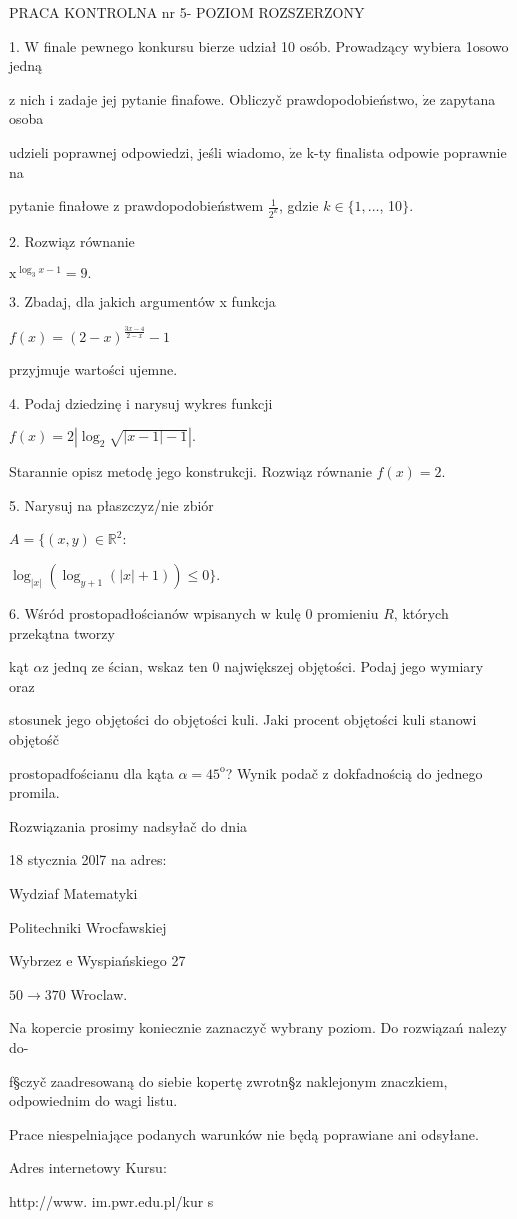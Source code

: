 \documentclass[a4paper,12pt]{article}
\begin{document}
PRACA KONTROLNA nr 5- POZIOM ROZSZERZONY

1. $\mathrm{W}$ finale pewnego konkursu bierze udział 10 osób. Prowadzący wybiera 1osowo jedną

$\mathrm{z}$ nich $\mathrm{i}$ zadaje jej pytanie finafowe. Obliczyč prawdopodobieństwo, $\dot{\mathrm{z}}\mathrm{e}$ zapytana osoba

udzieli poprawnej odpowiedzi, jeśli wiadomo, $\dot{\mathrm{z}}\mathrm{e}$ k-ty finalista odpowie poprawnie na

pytanie finałowe $\mathrm{z}$ prawdopodobieństwem $\displaystyle \frac{1}{2^{k}}$, gdzie $k\in\{1, \ldots$, 10$\}.$

2. Rozwiąz równanie

$\mathrm{x}^{\log_{3}x-1}=9.$

3. Zbadaj, dla jakich argumentów x funkcja

$f(x)=(2-x)^{\frac{3x-4}{2-x}}-1$

przyjmuje wartości ujemne.

4. Podaj dziedzinę $\mathrm{i}$ narysuj wykres funkcji

$f(x)=2|\log_{2}\sqrt{|x-1|-1}|.$

Starannie opisz metodę jego konstrukcji. Rozwiąz równanie $f(x)=2.$

5. Narysuj na płaszczyz/nie zbiór

$A=\{(x,y)\in \mathbb{R}^{2}$:

$\log_{|x|}(\log_{y+1}(|x|+1)) \leq 0\}.$

6. Wśród prostopadłościanów wpisanych $\mathrm{w}$ kulę $0$ promieniu $R$, których przekątna tworzy

kąt $\alpha \mathrm{z}$ jednq ze ścian, wskaz ten $0$ największej objętości. Podaj jego wymiary oraz

stosunek jego objętości do objętości kuli. Jaki procent objętości kuli stanowi objętośč

prostopadfościanu dla kąta $\alpha=45^{\mathrm{o}}$? Wynik podač $\mathrm{z}$ dokfadnością do jednego promila.

Rozwiązania prosimy nadsyłač do dnia

18 stycznia 20l7 na adres:

Wydziaf Matematyki

Politechniki Wrocfawskiej

Wybrzez $\mathrm{e}$ Wyspiańskiego 27

$50\rightarrow 370$ Wroclaw.

Na kopercie prosimy koniecznie zaznaczyč wybrany poziom. Do rozwiązań nalez$\mathrm{y}$ do-

f\S czyč zaadresowaną do siebie kopertę zwrotn\S z naklejonym znaczkiem, odpowiednim do wagi listu.

Prace niespelniające podanych warunków nie będą poprawiane ani odsyłane.

Adres internetowy Kursu:

http://www. im.pwr.edu.pl/kur s
\end{document}
